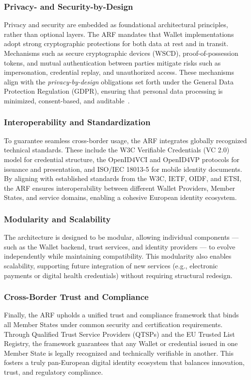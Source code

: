 \documentclass[sigconf,balance,nonacm,authordraft]{acmart}
\begin{document}
\subsubsection*{Privacy- and Security-by-Design}
Privacy and security are embedded as foundational architectural principles, rather than optional layers. The ARF mandates that Wallet implementations adopt strong cryptographic protections for both data at rest and in transit. Mechanisms such as secure cryptographic devices (WSCD), proof-of-possession tokens, and mutual authentication between parties mitigate risks such as impersonation, credential replay, and unauthorized access. These mechanisms align with the \textit{privacy-by-design} obligations set forth under the General Data Protection Regulation (GDPR), ensuring that personal data processing is minimized, consent-based, and auditable~\cite{EU_eIDAS2024}.

\subsubsection*{Interoperability and Standardization}
To guarantee seamless cross-border usage, the ARF integrates globally recognized technical standards. These include the W3C Verifiable Credentials (VC 2.0) model for credential structure, the OpenID4VCI and OpenID4VP protocols for issuance and presentation, and ISO/IEC 18013-5 for mobile identity documents. By aligning with established standards from the W3C, IETF, OIDF, and ETSI, the ARF ensures interoperability between different Wallet Providers, Member States, and service domains, enabling a cohesive European identity ecosystem.

\subsubsection*{Modularity and Scalability}
The architecture is designed to be modular, allowing individual components — such as the Wallet backend, trust services, and identity providers — to evolve independently while maintaining compatibility. This modularity also enables scalability, supporting future integration of new services (e.g., electronic payments or digital health credentials) without requiring structural redesign.

\subsubsection*{Cross-Border Trust and Compliance}
Finally, the ARF upholds a unified trust and compliance framework that binds all Member States under common security and certification requirements. Through Qualified Trust Service Providers (QTSPs) and the EU Trusted List Registry, the framework guarantees that any Wallet or credential issued in one Member State is legally recognized and technically verifiable in another. This fosters a truly pan-European digital identity ecosystem that balances innovation, trust, and regulatory compliance.
\end{document}
